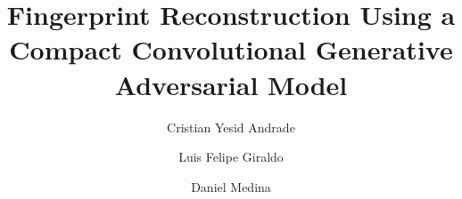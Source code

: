 \documentclass[a4paper,fleqn]{cas-dc}
\begin{document}
\let\WriteBookmarks\relax
\def\floatpagepagefraction{1}
\def\textpagefraction{.001}

\title [mode = title]{Fingerprint Reconstruction Using a Compact Convolutional Generative Adversarial Model}  


\author[1]{Cristian Yesid Andrade}\cormark[1]

\address[1]{Olimpia IT, Bogotá, Colombia}
\address[2]{Deptartment of Electric and Electronic Engineering, Universidad de los Andes, Cra 1 Nº 18A - 12, Bogotá, Colombia}


\author[2]{Luis Felipe Giraldo}
\author[1]{Daniel Medina}




\end{document}
